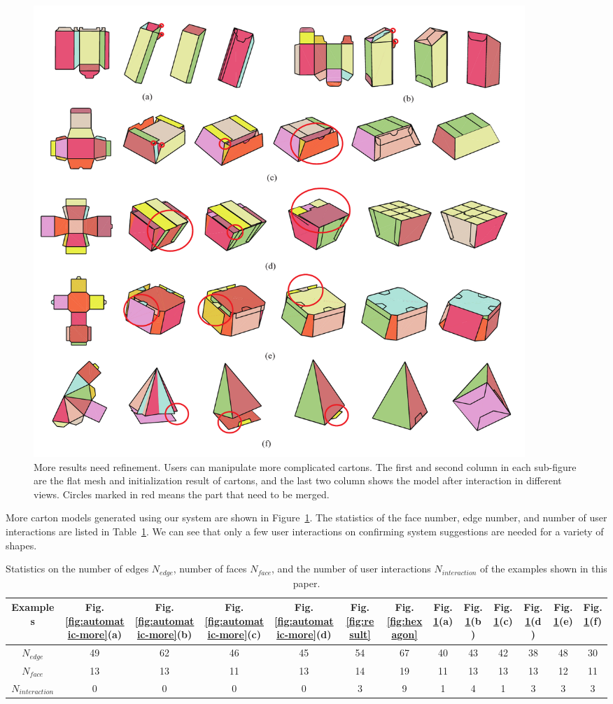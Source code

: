 \begin{figure}
	\centering
	\includegraphics[width=0.9\textwidth]{images/newMore}
	\caption{More results need refinement. Users can manipulate more complicated cartons. The first and second column in each sub-figure are the flat mesh and initialization result of cartons, and the last two column shows the model after interaction in  different views. Circles marked in red means the part that need to be merged.}
	\label{fig:result-more}
\end{figure}



More carton models generated using our system  are shown in Figure~\ref{fig:result-more}.
The statistics of the face number, edge number, and number of user interactions are listed in Table~\ref{table:statistics}. 
We can see that only a few user interactions on confirming system suggestions are needed for a variety of shapes.


\begin{table}
	\centering
	\caption{Statistics on the number of edges $N_{edge}$, number of faces $N_{face}$, and the number of user interactions $N_{interaction}$ of the examples shown in this paper.}
	\setlength{\tabcolsep}{1pt}
	\begin{tabular}{c|c|c|c|c|c|c|c|c|c|c|c|c}
		\hline
		Examples & Fig.\ref{fig:automatic-more}(a) & Fig.\ref{fig:automatic-more}(b) &  Fig.\ref{fig:automatic-more}(c) & Fig.\ref{fig:automatic-more}(d) & Fig.\ref{fig:result} & Fig.\ref{fig:hexagon} & Fig.\ref{fig:result-more}(a) & Fig.\ref{fig:result-more}(b)& Fig.\ref{fig:result-more}(c) &  Fig.\ref{fig:result-more}(d) & Fig.\ref{fig:result-more}(e)& Fig.\ref{fig:result-more}(f)\\
		\hline
		$N_{edge}$ & 49 & 62 & 46 & 45 & 54 & 67 & 40 & 43 & 42 & 38 & 48 & 30\\
		$N_{face}$  & 13 & 13 & 11 & 13 & 14 & 19 & 11 & 13 & 13 & 13 & 12 & 11\\
		$N_{interaction}$  & 0 & 0 & 0 & 0 & 3 & 9 & 1 & 4 & 1 & 3 & 3 & 3\\ 
		\hline
		\end{tabular}
		\label{table:statistics}
\end{table}


